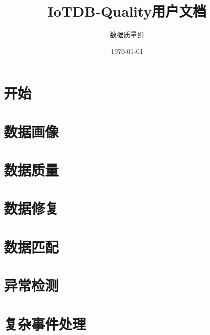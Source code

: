 \documentclass[cn,11pt,mode=simple,table]{elegantbook}
\title{IoTDB-Quality用户文档}
\author{数据质量组}
\institute{清华大学软件学院}
\date{\today}
\begin{document}
\maketitle
\tableofcontents
\mainmatter

\chapter{开始}




\chapter{数据画像}

















\chapter{数据质量}





\chapter{数据修复}





\chapter{数据匹配}








\chapter{异常检测}




\chapter{复杂事件处理}







\end{document}
